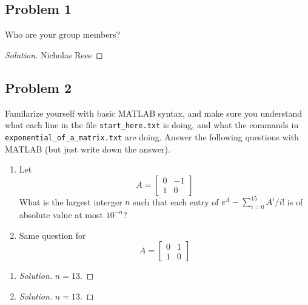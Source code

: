 \documentclass{article}
\begin{document}
\subsection*{Problem 1}
Who are your group members?
\begin{proof}[Solution]\let\qed\relax
	Nicholas Rees
\end{proof}

\subsection*{Problem 2}
Familarize yourself with basic MATLAB syntax,
and make sure you understand what each line in the file
\newline\verb|start_here.txt| is doing,
and what the commands in \verb|exponential_of_a_matrix.txt| are doing.
Answer the following questions with MATLAB (but just write down the answer).
\begin{enumerate}
	\item Let
		\[
			A = \begin{bmatrix} 0 & -1 \\ 1 & 0 \end{bmatrix}
		\]
		What is the largest interger $n$ such that each entry of
		$e^A - \sum_{i=0}^{15} A^i/i!$ is of absolute value at most $10^{-n}$?
	\item Same question for
		\[
			A = \begin{bmatrix} 0 & 1 \\ 1 & 0 \end{bmatrix}
		\]
\end{enumerate}
\begin{enumerate}
	\item \begin{proof}[Solution]\let\qed\relax
		$n = 13$.
	\end{proof}
	\item \begin{proof}[Solution]\let\qed\relax
		$n = 13$.
	\end{proof}
\end{enumerate}
\end{document}
